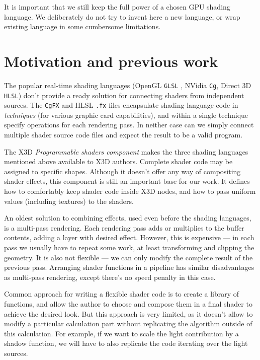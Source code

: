 \documentclass{egpubl}
\begin{document}
It is important that we still keep
the full power of a chosen GPU shading language.
We deliberately do not try to invent here a new language, or wrap existing
language in some cumbersome limitations.

\section{Motivation and previous work}

The popular real-time shading languages (OpenGL \texttt{GLSL} \cite{glsl:book}, NVidia \texttt{Cg}, Direct 3D \texttt{HLSL})
don't provide a ready solution for connecting shaders from independent sources.
The \texttt{CgFX} and HLSL \texttt{.fx} files encapsulate shading language code
in \emph{techniques} (for various graphic card capabilities),
and within a single technique specify operations for each rendering pass.
In neither case can we simply connect multiple shader source code files
and expect the result to be a valid program.

The X3D \textit{Programmable shaders component} \cite{x3d:shaders}
makes the three shading languages mentioned above available to X3D authors.
Complete shader code may be assigned to specific shapes.
Although it doesn't offer any way of compositing shader effects,
this component is still an important base for our work. It defines
how to comfortably keep shader code inside X3D nodes, and how to pass uniform
values (including textures) to the shaders.

An oldest solution to combining effects, used even before the shading languages,
is a multi-pass rendering. Each rendering pass adds or multiplies
to the buffer contents, adding a layer with desired effect.
However, this is expensive --- in each pass we usually have to repeat
some work, at least transforming and clipping the geometry.
It is also not flexible --- we can only modify
the complete result of the previous pass.
Arranging shader functions in a pipeline has similar disadvantages
as multi-pass rendering, except there's no speed penalty in this case.

Common approach for writing a flexible shader code is to create
a library of functions, and allow the author to choose and compose them
in a final shader to achieve the desired look. But this approach is very limited,
as it doesn't allow to modify a particular calculation part without
replicating the algorithm outside of this calculation.
For example, if we want to scale the light contribution by a shadow function,
we will have to also replicate the code iterating over the light sources.
\end{document}
